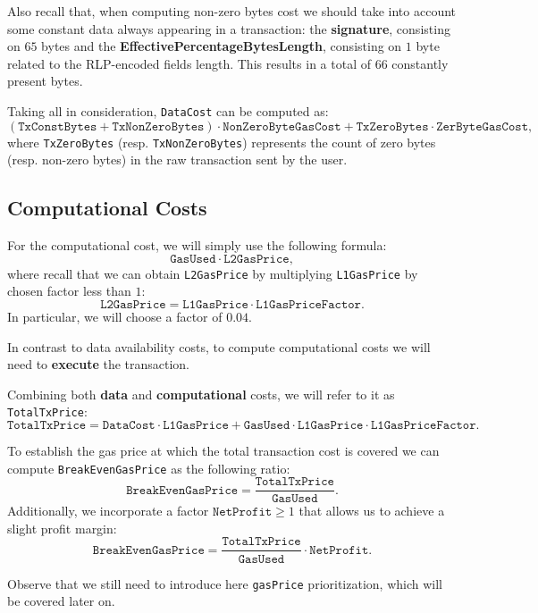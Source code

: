 Also recall that, when computing non-zero bytes cost we should take into account some constant data always appearing in a transaction: the \textbf{signature}, consisting on $65$ bytes and the \textbf{EffectivePercentageBytesLength}, consisting on $1$ byte related to the RLP-encoded fields length. This results in a total of $66$ constantly present bytes.

Taking all in consideration, \texttt{DataCost} can be computed as:
\[
(\texttt{TxConstBytes} + \texttt{TxNonZeroBytes}) \cdot \texttt{NonZeroByteGasCost} + \texttt{TxZeroBytes} \cdot \texttt{ZerByteGasCost},
\]
where \texttt{TxZeroBytes} (resp. \texttt{TxNonZeroBytes}) represents the count of zero bytes (resp. non-zero bytes) in the raw transaction sent by the user.


\subsection{Computational Costs}

For the computational cost, we will simply use the following formula:
\[
\texttt{GasUsed} \cdot \texttt{L2GasPrice},
\]
where recall that we can obtain \texttt{L2GasPrice} by multiplying \texttt{L1GasPrice} by chosen factor less than $1$:
\[
\texttt{L2GasPrice} = \texttt{L1GasPrice} \cdot \texttt{L1GasPriceFactor}.
\]
In particular, we will choose a factor of $0.04$.

In contrast to data availability costs, to compute computational costs we will need to \textbf{execute} the transaction.


Combining both \textbf{data} and \textbf{computational} costs, we will refer to it as \texttt{TotalTxPrice}:
\[
\texttt{TotalTxPrice} = \texttt{DataCost} \cdot \texttt{L1GasPrice} + \texttt{GasUsed} \cdot \texttt{L1GasPrice} \cdot \texttt{L1GasPriceFactor}.
\]

To establish the gas price at which the total transaction cost is covered we can compute \texttt{BreakEvenGasPrice} as the following ratio:
\[
\texttt{BreakEvenGasPrice} = \frac{\texttt{TotalTxPrice}}{\texttt{GasUsed}}.
\]
Additionally, we incorporate a factor $\texttt{NetProfit} \geq 1$ that allows us to achieve a slight profit margin:
\[
\texttt{BreakEvenGasPrice} = \frac{\texttt{TotalTxPrice}}{\texttt{GasUsed}} \cdot \texttt{NetProfit}.
\]

Observe that we still need to introduce here \texttt{gasPrice} prioritization, which will be covered later on.


